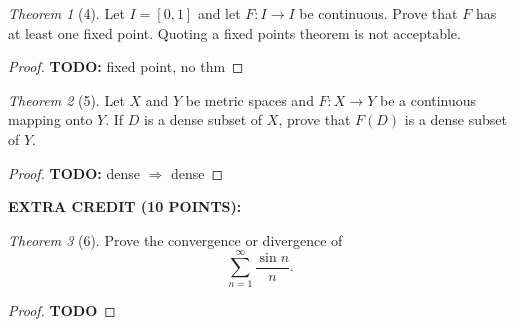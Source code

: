 \documentclass[12pt]{article}
\theoremstyle{remark}
\theoremstyle{named}
\newtheorem*{theorem}{Theorem}
\renewcommand{\implies}{\Rightarrow}
\begin{document}
\begin{theorem}[4]
    Let \(I = [0, 1]\) and let \(F : I \to I\) be continuous. Prove that \(F\) has at least one fixed point. Quoting a fixed points theorem is not acceptable.
\end{theorem}

\begin{proof}
    \textbf{TODO:} fixed point, no thm
\end{proof}

\begin{theorem}[5]
    Let \(X\) and \(Y\) be metric spaces and \(F : X \to Y\) be a continuous mapping onto \(Y\). If \(D\) is a dense subset of \(X\), prove that \(F(D)\) is a dense subset of \(Y\). 
\end{theorem}

\begin{proof}
    \textbf{TODO:} dense \(\implies\) dense
\end{proof}

\textbf{EXTRA CREDIT (10 POINTS):}

\begin{theorem}[6]
    Prove the convergence or divergence of 
    \[\sum_{n = 1}^\infty\frac{\sin n}{n}.\]
\end{theorem}

\begin{proof}
    \textbf{TODO} 
\end{proof}
\end{document}
